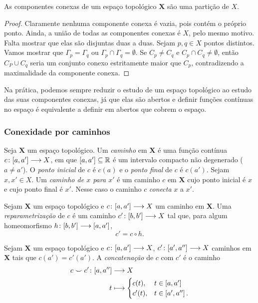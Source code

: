 \begin{proposition}
As componentes conexas de um espaço topológico $\bm X$ são uma partição de $X$.
\end{proposition}
\begin{proof}
Claramente nenhuma componente conexa é vazia, pois contém o próprio ponto. Ainda, a união de todas as componentes conexas é $X$, pelo mesmo motivo. Falta mostrar que elas são disjuntas duas a duas. Sejam $p,q \in X$ pontos distintos. Vamos mostrar que $\Gamma_p = \Gamma_q$ ou $\Gamma_p \cap \Gamma_q = \emptyset$. Se $C_p \neq C_q$ e $C_p \cap C_q \neq \emptyset$, então $C_P \cup C_q$ seria um conjunto conexo estritamente maior que $C_p$, contradizendo a maximalidade da componente conexa.
\end{proof}

Na prática, podemos sempre reduzir o estudo de um espaço topológico ao estudo das suas componentes conexas, já que elas são abertos e definir funções contínuas no espaço é equivalente a definir em abertos que cobrem o espaço.

\subsubsection{Conexidade por caminhos}

\begin{definition}
Seja $\bm X$ um espaço topológico. Um \emph{caminho} em $\bm X$ é uma função contínua ${c}\colon {\left[{a},{a'}\right]} \longrightarrow {X}$, em que $\left[{a},{a'}\right] \subseteq \mathbb{R}$ é um intervalo compacto não degenerado ($a \neq a'$). O \emph{ponto inicial} de $c$ é $c(a)$ e o \emph{ponto final} de $c$ é $c(a')$. Sejam $x,x' \in X$. Um \emph{caminho de $x$ para $x'$} é um caminho $c$ em $\bm X$ cujo ponto inicial é $x$ e cujo ponto final é $x'$. Nesse caso o caminho $c$ \emph{conecta} $x$ a $x'$.
\end{definition}

\begin{definition}
Sejam $\bm X$ um espaço topológico e ${c}\colon {\left[{a},{a'}\right]} \longrightarrow {X}$ um caminho em $\bm X$. Uma \emph{reparametrização} de $c$ é um caminho ${c'}\colon {\left[{b},{b'}\right]} \longrightarrow {X}$ tal que, para algum homeomorfismo ${h}\colon {\left[{b},{b'}\right]} \longrightarrow {\left[{a},{a'}\right]}$,
	\begin{equation*}
	c' = c \circ h.
	\end{equation*}
\end{definition}

\begin{definition}
Sejam $\bm X$ um espaço topológico e ${c}\colon {\left[{a},{a'}\right]} \longrightarrow {X}$, ${c'}\colon {\left[{a'},{a''}\right]} \longrightarrow {X}$ caminhos em $\bm X$ tais que $c(a') = c'(a')$. A \emph{concatenação} de $c$ com $c'$ é o caminho
	\begin{align*}
	\func{c \conca c'}{\intff{a}{a''}}{X}{t}{
		\begin{cases}
		c(t),	& t \in \intff{a}{a'} \\
		c'(t),	& t \in \intff{a'}{a''}.
		\end{cases}
	}
	\end{align*}
\end{definition}

